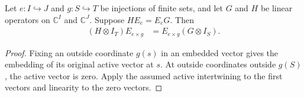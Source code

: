 \begin{lemma}
    \label{lem:physical_spectator_embedding_transport}
    \leanok
    Let $e:I\hookrightarrow J$ and $g:S\hookrightarrow T$ be injections of
    finite sets, and let $G$ and $H$ be linear operators on
    $\mathbb C^I$ and $\mathbb C^J$. Suppose $HE_e=E_eG$. Then
    \begin{align}
        (H\otimes I_T)E_{e\times g} & =E_{e\times g}(G\otimes I_S).
    \end{align}
\end{lemma}
\begin{proof}
    \leanok
    Fixing an outside coordinate $g(s)$ in an embedded vector gives the
    embedding of its original active vector at $s$. At outside coordinates
    outside $g(S)$, the active vector is zero. Apply the assumed active
    intertwining to the first vectors and linearity to the zero vectors.
\end{proof}
